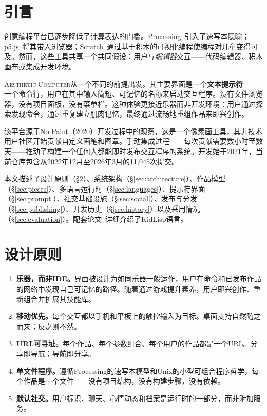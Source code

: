 \documentclass[10pt,letterpaper,twocolumn]{article}
\newcommand{\ac}{\textsc{Aesthetic.Computer}}
\begin{document}

\section{引言}

创意编程平台已逐步降低了计算表达的门槛。Processing~\citep{reas2007processing}引入了速写本隐喻；p5.js~\citep{mccarthy2015p5js}将其带入浏览器；Scratch~\citep{resnick2009scratch}通过基于积木的可视化编程使编程对儿童变得可及。然而，这些工具共享一个共同假设：用户与\emph{编辑器}交互——代码编辑器、积木画布或集成开发环境。

\ac{}从一个不同的前提出发。其主要界面是一个\textbf{文本提示符}——一个命令行，用户在其中输入简短、可记忆的名称来启动交互程序。没有文件浏览器，没有项目面板，没有菜单栏。这种体验更接近乐器而非开发环境：用户通过探索发现命令，通过重复建立肌肉记忆，最终通过流畅地重组作品来即兴创作。

该平台源于No Paint（2020）开发过程中的观察，这是一个像素画工具，其非技术用户社区开始贡献自定义画笔和图章。手动集成过程——每次贡献需要数小时至数天——推动了构建一个任何人都能即时发布交互程序的系统。开发始于2021年，当前仓库包含从2022年12月至2026年3月的11,045次提交。

本文描述了设计原则（\S\ref{sec:principles}）、系统架构（\S\ref{sec:architecture}）、作品模型（\S\ref{sec:pieces}）、多语言运行时（\S\ref{sec:languages}）、提示符界面（\S\ref{sec:prompt}）、社交基础设施（\S\ref{sec:social}）、发布与分发（\S\ref{sec:publishing}）、开发历史（\S\ref{sec:history}）以及采用情况（\S\ref{sec:evaluation}）。配套论文~\citep{scudder2026kidlisp}详细介绍了KidLisp语言。


\section{设计原则}
\label{sec:principles}

\begin{enumerate}
  \item \textbf{乐器，而非IDE。}界面被设计为如同乐器一般运作，用户在命令和已发布作品的网络中发现自己可记忆的路径。随着通过游戏提升素养，用户即兴创作、重新组合并扩展其技能库。
  \item \textbf{移动优先。}每个交互都以手机和平板上的触控输入为目标。桌面支持自然随之而来；反之则不然。
  \item \textbf{URL可寻址。}每个作品、每个参数组合、每个用户的作品都是一个URL。分享即导航；导航即分享。
  \item \textbf{单文件程序。}遵循Processing的速写本模型和Unix的小型可组合程序哲学，每个作品是一个文件——没有项目结构，没有构建步骤，没有依赖。
  \item \textbf{默认社交。}用户标识、聊天、心情动态和档案是运行时的一部分，而非附加服务。
\end{enumerate}
\end{document}
